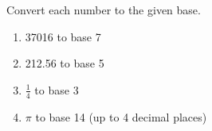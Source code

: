 \documentclass{article}
\begin{document}

\begin{problem}{}{}
    Convert each number to the given base.
    \begin{enumerate}[label=\textbf{\arabic*}.]
        \item 37016 to base 7
        \item 212.56 to base 5
        \item $\frac{1}{4}$ to base 3
        \item $\pi$ to base 14 (up to 4 decimal places)
    \end{enumerate}
\end{problem}
\end{document}
